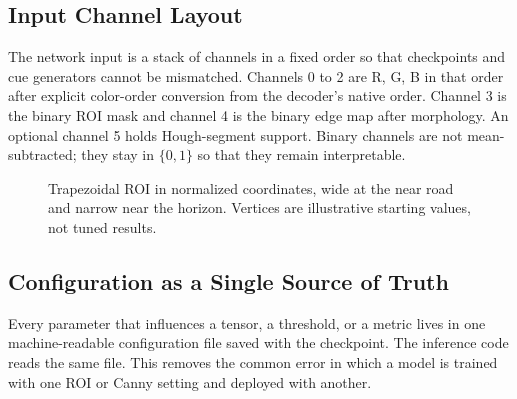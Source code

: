 \documentclass[10pt,a4paper,twocolumn]{article}
\begin{document}
\subsection{Input Channel Layout}
The network input is a stack of channels in a fixed order so that checkpoints and cue generators cannot be mismatched. Channels 0 to 2 are R, G, B in that order after explicit color-order conversion from the decoder's native order. Channel 3 is the binary ROI mask and channel 4 is the binary edge map after morphology. An optional channel 5 holds Hough-segment support. Binary channels are not mean-subtracted; they stay in $\{0,1\}$ so that they remain interpretable.

\begin{figure}[H]
\centering
{}
\caption{Trapezoidal ROI in normalized coordinates, wide at the near road and narrow near the horizon. Vertices are illustrative starting values, not tuned results.}
\end{figure}

\subsection{Configuration as a Single Source of Truth}
Every parameter that influences a tensor, a threshold, or a metric lives in one machine-readable configuration file saved with the checkpoint. The inference code reads the same file. This removes the common error in which a model is trained with one ROI or Canny setting and deployed with another.
\end{document}

